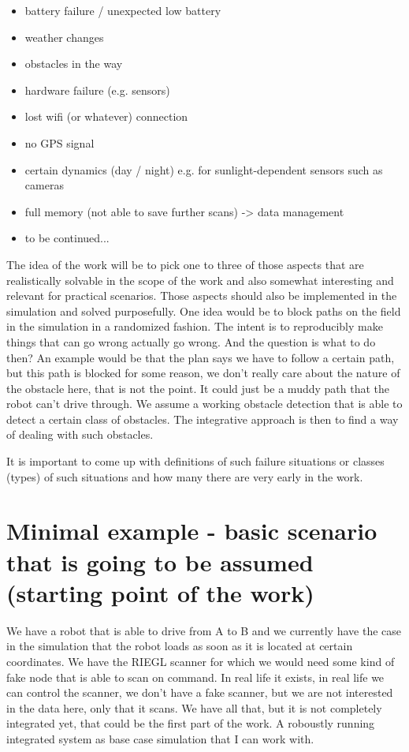 \documentclass[german, master, expose, latin1]{base/thesis_KBS}
\begin{document}
\begin{itemize}
    \item battery failure / unexpected low battery
    \item weather changes
    \item obstacles in the way
    \item hardware failure (e.g. sensors)
    \item lost wifi (or whatever) connection
    \item no GPS signal
    \item certain dynamics (day / night) e.g. for sunlight-dependent sensors such as cameras
    \item full memory (not able to save further scans) -> data management
    \item to be continued...
\end{itemize}

The idea of the work will be to pick one to three of those aspects that are realistically solvable in the scope of the work and also somewhat interesting and 
relevant for practical scenarios. Those aspects should also be implemented in the simulation and solved purposefully.\newline
One idea would be to block paths on the field in the simulation in a randomized fashion. The intent is to reproducibly make things that can go wrong actually go wrong.
And the question is what to do then? An example would be that the plan says we have to follow a certain path, but this path is blocked for some reason, we don't really
care about the nature of the obstacle here, that is not the point. It could just be a muddy path that the robot can't drive through. We assume a working obstacle detection
that is able to detect a certain class of obstacles. The integrative approach is then to find a way of dealing with such obstacles.\newline

It is important to come up with definitions of such failure situations or classes (types) of such situations and how many there are very early in the work.

\section{Minimal example - basic scenario that is going to be assumed (starting point of the work)}

We have a robot that is able to drive from A to B and we currently have the case in the simulation that the robot loads as soon as it is located at certain coordinates.
We have the RIEGL scanner for which we would need some kind of fake node that is able to scan on command. In real life it exists, in real life we can control the scanner, 
we don't have a fake scanner, but we are not interested in the data here, only that it scans. We have all that, but it is not completely integrated yet, that could
be the first part of the work. A roboustly running integrated system as base case simulation that I can work with.\newline
\end{document}

